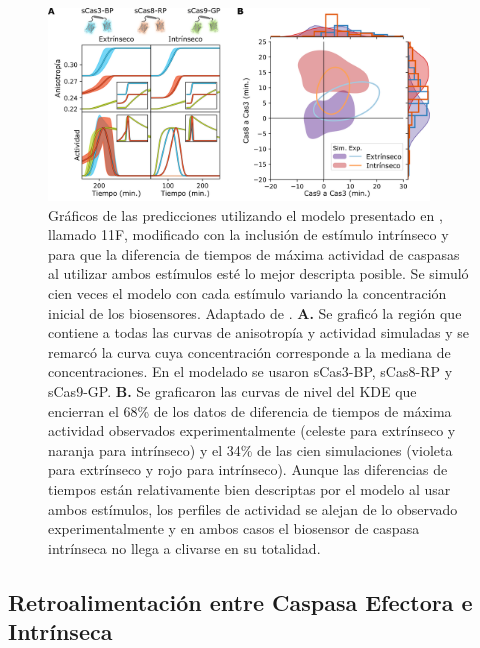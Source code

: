 \begin{figure}
    \centering
    \includegraphics[width=0.9\textwidth]{img/cap_4/albeck11f.png}
    \caption{\footnotesize{Gráficos de las predicciones utilizando el modelo presentado en \cite{Albeck2008}, llamado 11F, modificado con la inclusión de estímulo intrínseco y para que la diferencia de tiempos de máxima actividad de caspasas al utilizar ambos estímulos esté lo mejor descripta posible. Se simuló cien veces el modelo con cada estímulo variando la concentración inicial de los biosensores.  Adaptado de \cite{Corbat2021}. \textbf{A.} Se graficó la región que contiene a todas las curvas de anisotropía y actividad simuladas y se remarcó la curva cuya concentración corresponde a la mediana de concentraciones. En el modelado se usaron sCas3-BP, sCas8-RP y sCas9-GP. \textbf{B.} Se graficaron las curvas de nivel del KDE que encierran el 68\% de los datos de diferencia de tiempos de máxima actividad observados experimentalmente (celeste para extrínseco y naranja  para intrínseco) y el 34\% de las cien simulaciones (violeta para extrínseco y rojo  para intrínseco). Aunque las diferencias de tiempos están relativamente bien descriptas por el modelo al usar ambos estímulos, los perfiles de actividad se alejan de lo observado experimentalmente y en ambos casos el biosensor de caspasa intrínseca no llega a clivarse en su totalidad.}}
    \label{fig:albeck11f}
\end{figure}


\subsection{Retroalimentación entre Caspasa Efectora e Intrínseca}
\label{sec:modelo:feedback}


